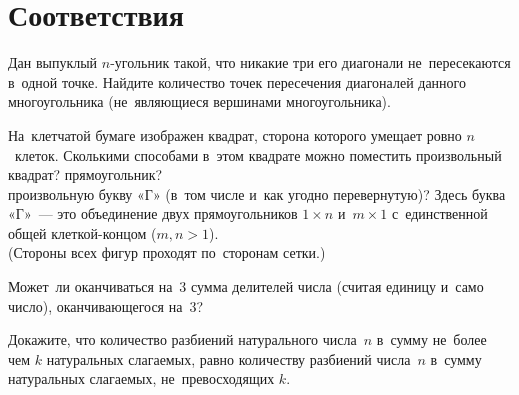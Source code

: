 

\section*{Соответствия}


\begin{problems}

\item
Дан выпуклый $n$-угольник такой, что никакие три его диагонали не~пересекаются
в~одной точке.
Найдите количество точек пересечения диагоналей данного многоугольника
(не~являющиеся вершинами многоугольника).

\item
На~клетчатой бумаге изображен квадрат, сторона которого умещает ровно
$n$~клеток.
Сколькими способами в~этом квадрате можно поместить произвольный
\\
\subproblem квадрат?
\qquad
\subproblem прямоугольник?
\\
\subproblem
произвольную букву «Г» (в~том числе и~как угодно перевернутую)?
Здесь буква «Г»~— это объединение двух прямоугольников $1 \times n$
и~$m \times 1$ с~единственной общей клеткой-концом ($m, n > 1$).
\\
(Стороны всех фигур проходят по~сторонам сетки.)

\item
Может~ли оканчиваться на~$3$ сумма делителей числа (считая единицу и~само
число), оканчивающегося на~$3$?

\item
Докажите, что количество разбиений натурального числа~$n$ в~сумму не~более чем
$k$ натуральных слагаемых, равно количеству разбиений числа~$n$ в~сумму
натуральных слагаемых, не~превосходящих $k$.



\end{problems}
